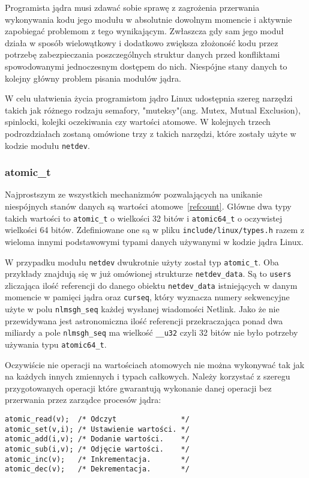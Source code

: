 \documentclass[10pt]{article}
\begin{document}
Programista jądra musi zdawać sobie sprawę z zagrożenia przerwania wykonywania kodu jego modułu w absolutnie dowolnym momencie i aktywnie zapobiegać problemom z tego wynikającym. Zwłaszcza gdy sam jego moduł działa w sposób wielowątkowy i dodatkowo zwiększa złożoność kodu przez potrzebę zabezpieczania poszczególnych struktur danych przed konfliktami spowodowanymi jednoczesnym dostępem do nich. Niespójne stany danych to kolejny główny problem pisania modułów jądra.

W celu ułatwienia życia programistom jądro Linux udostępnia szereg narzędzi takich jak różnego rodzaju semafory, "muteksy"(ang. Mutex, Mutual Exclusion), spinlocki, kolejki oczekiwania czy wartości atomowe. W kolejnych trzech podrozdziałach zostaną omówione trzy z takich narzędzi, które zostały użyte w kodzie modułu \texttt{netdev}.

\subsubsection{atomic\_t}

Najprostszym ze wszystkich mechanizmów pozwalających na unikanie niespójnych stanów danych są wartości atomowe~\ref{refcount}. Główne dwa typy takich wartości to \texttt{atomic\_t} o wielkości 32 bitów i \texttt{atomic64\_t} o oczywistej wielkości 64 bitów. Zdefiniowane one są w pliku \texttt{include/linux/types.h} razem z wieloma innymi podstawowymi typami danych używanymi w kodzie jądra Linux.

W przypadku modułu \texttt{netdev} dwukrotnie użyty został typ \texttt{atomic\_t}. Oba przykłady znajdują się w już omówionej strukturze \texttt{netdev\_data}. Są to \texttt{users} zliczająca ilość referencji do danego obiektu \texttt{netdev\_data} istniejących w danym momencie w pamięci jądra oraz \texttt{curseq}, który wyznacza numery sekwencyjne użyte w polu \texttt{nlmsgh\_seq} każdej wysłanej wiadomości Netlink. Jako że nie przewidywana jest astronomiczna ilość referencji przekraczająca ponad dwa miliardy a pole \texttt{nlmsgh\_seq} ma wielkość \texttt{\_\_u32} czyli 32 bitów nie było potrzeby używania typu \texttt{atomic64\_t}.

Oczywiście nie operacji na wartościach atomowych nie można wykonywać tak jak na każdych innych zmiennych i typach całkowych. Należy korzystać z szeregu przygotowanych operacji które gwarantują wykonanie danej operacji bez przerwania przez zarządce procesów jądra:

\begin{verbatim}
atomic_read(v);  /* Odczyt               */
atomic_set(v,i); /* Ustawienie wartości. */
atomic_add(i,v); /* Dodanie wartości.    */
atomic_sub(i,v); /* Odjęcie wartości.    */
atomic_inc(v);   /* Inkrementacja.       */
atomic_dec(v);   /* Dekrementacja.       */
\end{verbatim}
\end{document}
